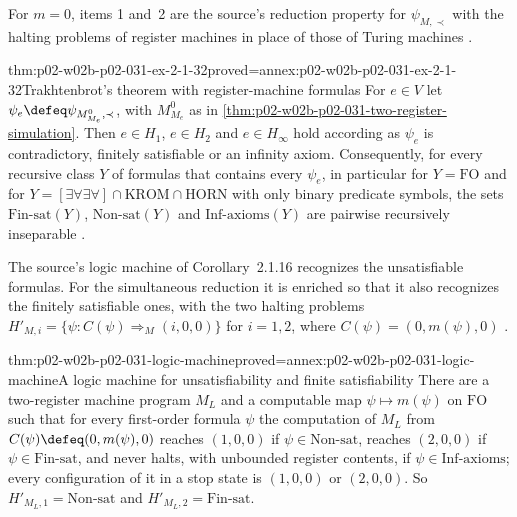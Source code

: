 For \(m=0\), items 1 and~2 are the source's reduction property for
\(\psi_{M,\prec}\) with the halting problems of register machines in place of
those of Turing machines \cite[Sect.~2.1.2, p.~34]{BorgerGradelGurevich1997}.

\begin{hbcorollary}{thm:p02-w02b-p02-031-ex-2-1-32}{proved=annex:p02-w02b-p02-031-ex-2-1-32}{Trakhtenbrot's theorem with register-machine formulas}
For \(e\in V\) let \(\psi_e\defeq\psi_{M^{0}_{M_e},\prec}\), with
\(M^{0}_{M_e}\) as in \cref{thm:p02-w02b-p02-031-two-register-simulation}.
Then \(e\in H_1\), \(e\in H_2\) and \(e\in H_\infty\) hold according as
\(\psi_e\) is contradictory, finitely satisfiable or an infinity axiom.
Consequently, for every recursive class \(Y\) of formulas that contains every
\(\psi_e\), in particular for \(Y=\mathrm{FO}\) and for
\(Y=[\exists\forall\exists\forall]\cap\mathrm{KROM}\cap\mathrm{HORN}\) with
only binary predicate symbols, the sets \(\mathrm{Fin\text{-}sat}(Y)\),
\(\mathrm{Non\text{-}sat}(Y)\) and \(\mathrm{Inf\text{-}axioms}(Y)\) are
pairwise recursively inseparable
\cite[Sect.~2.1.2, Thm.~2.1.30 and Exercise~2.1.32]{BorgerGradelGurevich1997}.
\end{hbcorollary}

The source's logic machine of Corollary~2.1.16 recognizes the unsatisfiable
formulas.  For the simultaneous reduction it is enriched so that it also
recognizes the finitely satisfiable ones, with the two halting problems
\(H'_{M,i}=\{\psi:C(\psi)\Rightarrow_M(i,0,0)\}\) for \(i=1,2\), where
\(C(\psi)=(0,m(\psi),0)\) \cite[Sect.~2.1.2, p.~36]{BorgerGradelGurevich1997}.

\begin{hbtheorem}{thm:p02-w02b-p02-031-logic-machine}{proved=annex:p02-w02b-p02-031-logic-machine}{A logic machine for unsatisfiability and finite satisfiability}
There are a two-register machine program \(M_L\) and a computable map
\(\psi\mapsto m(\psi)\) on \(\mathrm{FO}\) such that for every first-order
formula \(\psi\) the computation of \(M_L\) from \(C(\psi)\defeq(0,m(\psi),0)\)
reaches \((1,0,0)\) if \(\psi\in\mathrm{Non\text{-}sat}\), reaches \((2,0,0)\)
if \(\psi\in\mathrm{Fin\text{-}sat}\), and never halts, with unbounded register
contents, if \(\psi\in\mathrm{Inf\text{-}axioms}\); every configuration of it
in a stop state is \((1,0,0)\) or \((2,0,0)\).  So
\(H'_{M_L,1}=\mathrm{Non\text{-}sat}\) and \(H'_{M_L,2}=\mathrm{Fin\text{-}sat}\).
\end{hbtheorem}

